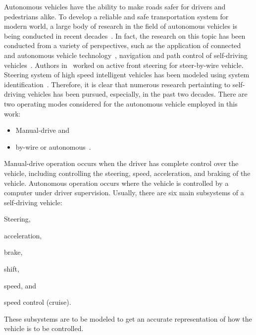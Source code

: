 \documentclass[conference]{IEEEtran}
\begin{document}
Autonomous vehicles have the ability to make roads safer for drivers
and pedestrians alike. To develop a reliable and safe transportation system for
modern world, a large body of research in the field of autonomous vehicles is
being conducted in recent decades~\cite{Liu2017,Prasad2020}. In fact, the research on this topic has been conducted from a variety of perspectives, such as the application of connected and autonomous vehicle technology~\cite{DoT2017}, navigation and path control of self-driving vehicles~\cite{Duong2018,Chajan2021}. Authors in~\cite{Saruchi2015} worked on active front steering for steer-by-wire vehicle.  Steering system of high speed intelligent vehicles has been modeled using system identification~\cite{Li1999}. Therefore, it is clear that numerous research pertainting to self-driving vehicles has been pursued, especially, in the past two decades. There are two operating modes considered for the autonomous vehicle employed in this work: %
%
\begin{itemize}
  \item Manual-drive and
  \item by-wire or autonomous~\cite{Saruchi2015}.
\end{itemize}
%
Manual-drive operation occurs when the driver has complete control over the vehicle, including controlling the steering, speed, acceleration, and braking of the vehicle. Autonomous operation occurs where the vehicle is controlled by a computer under driver supervision.
%
Usually, there are six main subsystems of a self-driving vehicle: %
%
\begin{enumerate*}
\item  Steering,

\item acceleration,

\item brake,

\item shift,

\item speed, and

\item speed control (cruise).
\end{enumerate*}
%
These subsystems are to be modeled to get an accurate representation of how
the vehicle is to be controlled. %
\end{document}

